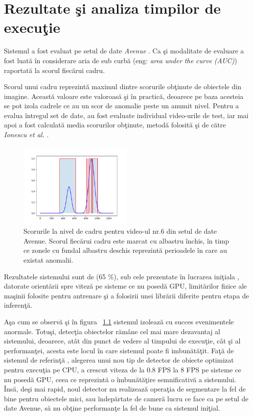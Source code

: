 \documentclass[a4paper,12pt]{report}
\begin{document}
\chapter {Rezultate şi analiza timpilor de execuţie}

\quad Sistemul a fost evaluat pe setul de date \emph{Avenue} . Ca şi modalitate de evaluare a fost luată în considerare aria de sub curbă (eng: \emph {area under the curve (AUC)}) raportată la scorul fiecărui cadru. 
\par Scorul unui cadru reprezintă maximul dintre scorurile obţinute de obiectele din imagine. Această valoare este valoroasă şi în practică, deoarece pe baza acesteia se pot izola cadrele ce au un scor de anomalie peste un anumit nivel. Pentru a evalua întregul set de date, au fost evaluate individual video-urile de test, iar mai apoi a fost calculată media scorurilor obţinute, metodă folosită şi de către  \emph{Ionescu et al.} \cite{ionescu2019object}.
\par 
\begin{figure}
\begin{center}
        \includegraphics[width = 0.5\textwidth]{images/rezultate_video_6}
			 \caption{Scorurile la nivel de cadru pentru video-ul nr.6 din setul de date Avenue. Scorul fiecărui cadru este marcat cu albastru închis, în timp ce zonele cu fundal albastru deschis reprezintă perioadele în care au existat anomalii.}
			 \label{fig:results_6}
\end{center}
\end{figure}
\quad Rezultatele sistemului sunt de (65 \%), sub cele prezentate în lucrarea iniţiala  \cite{ionescu2019object}, datorate orientării spre viteză pe sisteme ce nu posedă GPU, limitărilor fizice ale maşinii folosite pentru antrenare şi a folosirii unei librării diferite pentru etapa de inferenţă.
\par Aşa cum se observă şi în figura ~\ref{fig:results_6} sistemul izolează cu succes evenimentele anormale. Totuşi, detecţia obiectelor rămâne cel mai mare dezavantaj al sistemului, deoarece, atât din punct de vedere al timpului de execuţie, cât şi al performanţei, acesta este locul în care sistemul poate fi imbunătăţit. Faţă de sistemul de referinţă  \cite{ionescu2019object}, alegerea unui nou tip de detector de obiecte optimizat pentru execuţia pe CPU, a crescut viteza de la 0.8 FPS la 8 FPS pe sisteme ce nu posedă GPU, ceea ce reprezintă o îmbunătăţire semnificativă a sistemului. Însă, deşi mai rapid, noul detector nu realizează operaţia de segmentare la fel de bine pentru obiectele mici, sau îndepărtate de cameră lucru ce face ca pe setul de date Avenue, să nu obţine performanţe la fel de bune ca sistemul iniţial. 
\end{document}
